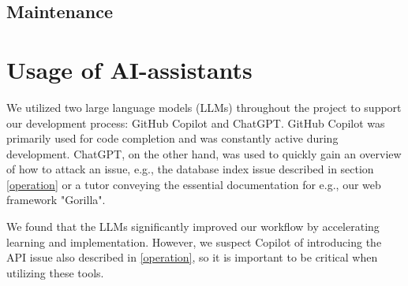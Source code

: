 \subsection{Maintenance}\label{maintainence}


\section{Usage of AI-assistants}
We utilized two large language models (LLMs) throughout the project to support our development process: GitHub Copilot and ChatGPT. GitHub Copilot was primarily used for code completion and was constantly active during development. ChatGPT, on the other hand, was used to quickly gain an overview of how to attack an issue, e.g., the database index issue described in section \ref{operation} or a tutor conveying the essential documentation for e.g., our web framework "Gorilla".

We found that the LLMs significantly improved our workflow by accelerating learning and implementation. However, we suspect Copilot of introducing the API issue also described in \ref{operation}, so it is important to be critical when utilizing these tools.